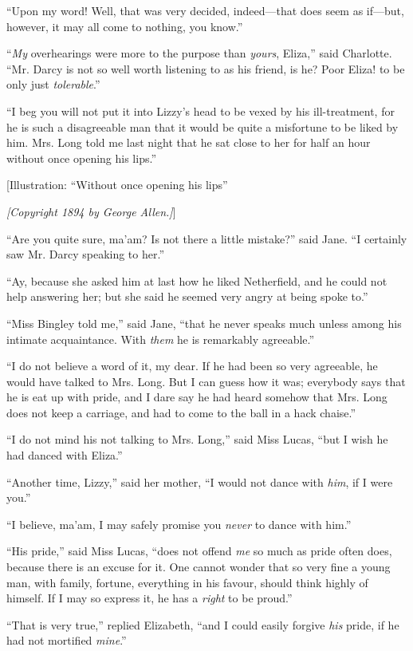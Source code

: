 \documentclass[12pt]{book}
\begin{document}
``Upon my word! Well, that was very decided, indeed---that does seem as if---but, however, it may all come to nothing, you know.''

``\textit{My} overhearings were more to the purpose than \textit{yours}, Eliza,'' said Charlotte. ``Mr. Darcy is not so well worth listening to as his friend, is he? Poor Eliza! to be only just \textit{tolerable}.''

``I beg you will not put it into Lizzy's head to be vexed by his ill-treatment, for he is such a disagreeable man that it would be quite a misfortune to be liked by him. Mrs. Long told me last night that he sat close to her for half an hour without once opening his lips.''

[Illustration: ``Without once opening his lips''

\emph{[\textit{Copyright 1894 by George Allen.}]}]

``Are you quite sure, ma'am? Is not there a little mistake?'' said Jane. ``I certainly saw Mr. Darcy speaking to her.''

``Ay, because she asked him at last how he liked Netherfield, and he could not help answering her; but she said he seemed very angry at being spoke to.''

``Miss Bingley told me,'' said Jane, ``that he never speaks much unless among his intimate acquaintance. With \textit{them} he is remarkably agreeable.''

``I do not believe a word of it, my dear. If he had been so very agreeable, he would have talked to Mrs. Long. But I can guess how it was; everybody says that he is eat up with pride, and I dare say he had heard somehow that Mrs. Long does not keep a carriage, and had to come to the ball in a hack chaise.''

``I do not mind his not talking to Mrs. Long,'' said Miss Lucas, ``but I wish he had danced with Eliza.''

``Another time, Lizzy,'' said her mother, ``I would not dance with \textit{him}, if I were you.''

``I believe, ma'am, I may safely promise you \textit{never} to dance with him.''

``His pride,'' said Miss Lucas, ``does not offend \textit{me} so much as pride often does, because there is an excuse for it. One cannot wonder that so very fine a young man, with family, fortune, everything in his favour, should think highly of himself. If I may so express it, he has a \textit{right} to be proud.''

``That is very true,'' replied Elizabeth, ``and I could easily forgive \textit{his} pride, if he had not mortified \textit{mine}.''
\end{document}
